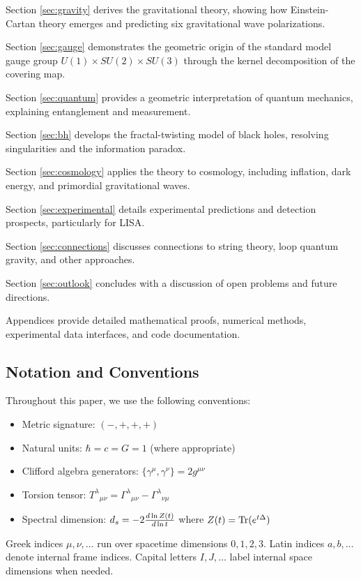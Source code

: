 Section \ref{sec:gravity} derives the gravitational theory, showing how Einstein-Cartan theory emerges and predicting six gravitational wave polarizations.

Section \ref{sec:gauge} demonstrates the geometric origin of the standard model gauge group $U(1) \times SU(2) \times SU(3)$ through the kernel decomposition of the covering map.

Section \ref{sec:quantum} provides a geometric interpretation of quantum mechanics, explaining entanglement and measurement.

Section \ref{sec:bh} develops the fractal-twisting model of black holes, resolving singularities and the information paradox.

Section \ref{sec:cosmology} applies the theory to cosmology, including inflation, dark energy, and primordial gravitational waves.

Section \ref{sec:experimental} details experimental predictions and detection prospects, particularly for LISA.

Section \ref{sec:connections} discusses connections to string theory, loop quantum gravity, and other approaches.

Section \ref{sec:outlook} concludes with a discussion of open problems and future directions.

Appendices provide detailed mathematical proofs, numerical methods, experimental data interfaces, and code documentation.

\subsection{Notation and Conventions}

Throughout this paper, we use the following conventions:
\begin{itemize}
    \item Metric signature: $(-,+,+,+)$
    \item Natural units: $\hbar = c = G = 1$ (where appropriate)
    \item Clifford algebra generators: $\{\gamma^\mu, \gamma^\nu\} = 2g^{\mu\nu}$
    \item Torsion tensor: $T^\lambda{}_{\mu\nu} = \Gamma^\lambda{}_{\mu\nu} - \Gamma^\lambda{}_{\nu\mu}$
    \item Spectral dimension: $d_s = -2 \frac{d \ln Z(t)}{d \ln t}$ where $Z(t) = \mathrm{Tr}(e^{t\Delta})$
\end{itemize}

Greek indices $\mu, \nu, \ldots$ run over spacetime dimensions $0,1,2,3$. Latin indices $a,b,\ldots$ denote internal frame indices. Capital letters $I,J,\ldots$ label internal space dimensions when needed.
